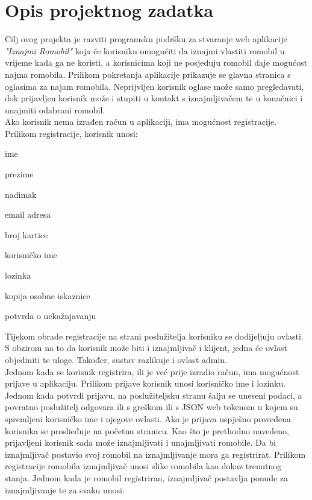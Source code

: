 \chapter{Opis projektnog zadatka}
		
		\indent Cilj ovog projekta je razviti programsku podršku za stvaranje web aplikacije \emph{"Iznajmi Romobil"} koja će korisniku omogućiti da iznajmi vlastiti romobil u vrijeme kada ga ne koristi, a korisnicima koji ne posjeduju romobil daje mogućost najma romobila. \newline
		\indent Prilikom pokretanja aplikacije prikazuje se glavna stranica s oglasima za najam romobila. Neprijvljen korisnik oglase može samo pregledavati, dok prijavljen korisnik može i stupiti u kontakt s iznajmljivačem te u konačnici i unajmiti odabrani romobil. \\
		\indent Ako korisnik nema izrađen račun u aplikaciji, ima mogućnost registracije. Prilikom registracije, korisnik unosi:
		\begin{packed_item} 
			\item {ime}
			\item {prezime}
			\item {nadimak}
			\item {email adresa}
			\item {broj kartice}
			\item {korisničko ime}
			\item {lozinka}
			\item {kopija osobne iskaznice}
			\item {potvrda o nekažnjavanju}  
		\end{packed_item}
		\indent Tijekom obrade registracije na strani poslužitelja korisniku se dodijeljuju ovlasti. S obzirom na to da korisnik može biti i iznajmljivač i klijent, jedna će ovlast  objediniti te uloge. Također, sustav razlikuje i ovlast admin.  \\
		\indent Jednom kada se korisnik registrira, ili je već prije izradio račun, ima mogućnost prijave u aplikaciju. Prilikom prijave korisnik unosi korisničko ime i lozinku. Jednom kada potvrdi prijavu, na poslužiteljsku stranu šalju se uneseni podaci, a povratno poslužitelj odgovara ili s greškom ili s JSON web tokenom u kojem su spremljeni korisničko ime i njegove ovlasti.
		\indent Ako je prijava uspješno provedena korisnika se proslieđuje na početnu stranicu. Kao što je prethodno navedeno, prijavljeni korisnik sada može iznajmljivati i unajmljivati romobile. Da bi iznajmljivač postavio svoj romobil na iznajmljivanje mora ga registrirat. Prilikom registracije romobila iznajmljivač unosi slike romobila kao dokaz trenutnog stanja. Jednom kada je romobil registriran, iznajmljivač postavlja ponude za iznajmljivanje te za svaku unosi:
